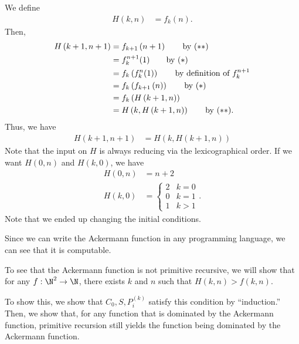 \documentclass[10pt]{mypackage}
\begin{document}
\begin{example}
We define
\begin{align*}
  H\left(k,n\right) &= f_{k}(n).\tag*{(\textasteriskcentered\textasteriskcentered)}
\end{align*}
Then,
\begin{align*}
  H\left(k+1,n+1\right) &= f_{k+1}\left(n+1\right)\tag*{by (\textasteriskcentered\textasteriskcentered)}\\
                        &= f_{k}^{n+1}(1)\tag*{by (\textasteriskcentered)}\\
                        &= f_{k}\left(f_{k}^{n}(1)\right) \tag*{by definition of $f^{n+1}_{k}$}\\
                        &= f_{k}\left(f_{k+1}\left(n\right)\right)\tag*{by (\textasteriskcentered)}\\
                        &= f_{k}\left(H\left(k+1,n\right)\right)\\
                        &= H\left(k,H\left(k+1,n\right)\right)\tag*{by (\textasteriskcentered\textasteriskcentered)}.
\end{align*}
Thus, we have
\begin{align*}
  H\left(k+1,n+1\right) &= H\left(k,H\left(k+1,n\right)\right)
\end{align*}
Note that the input on $H$ is always reducing via the lexicographical order. If we want $H\left(0,n\right)$ and $H\left(k,0\right)$, we have
\begin{align*}
  H\left(0,n\right) &= n+2\\
  H\left(k,0\right) &= \begin{cases}
    2 & k=0\\
    0 & k=1\\
    1 & k > 1
  \end{cases}.
\end{align*}
Note that we ended up changing the initial conditions.\newline

Since we can write the Ackermann function in any programming language, we can see that it is computable.\newline

To see that the Ackermann function is not primitive recursive, we will show that for any $f: \N^2\rightarrow \N$, there exists $k$ and $n$ such that $H\left(k,n\right) > f\left(k,n\right)$.\newline

To show this, we show that $C_0,S,P_{i}^{(k)}$ satisfy this condition by ``induction.'' Then, we show that, for any function that is dominated by the Ackermann function, primitive recursion still yields the function being dominated by the Ackermann function.
\end{example}
\end{document}
